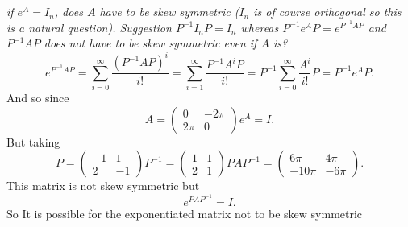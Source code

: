 \documentclass{article}
\begin{document}
    \section{}
    \emph{if $e^{A}=I_n$, does $A$ have to be skew symmetric ($I_n$ is of course orthogonal so this is a natural question). Suggestion
    $P^{-1}I_nP = I_n$ whereas $P^{-1}e^{A}P = e^{P^{-1}AP}$ and $P^{-1}AP$ does not have to be skew symmetric even if $A$ is?}
    \[
    e^{P^{-1}AP} = \sum_{i=0}^{\infty}\frac{(P^{-1}AP)^{i}}{i!} = \sum_{i=1}^{\infty}\frac{P^{-1}A^{i}P}{i!} = P^{-1}\sum_{i=0}^{\infty} \frac{A^{i}}{i!} P = P^{-1}e^{A}P
    .\] 
    And so since 
    \[
    A = 
    \begin{pmatrix}
        0 & -2\pi\\
        2\pi & 0
    \end{pmatrix}
    e^{A} = I
    .\] 
    But taking
    \[
    P = 
    \begin{pmatrix}
        -1 & 1\\
        2 & -1
    \end{pmatrix}
    P^{-1} =
    \begin{pmatrix}
        1 & 1\\
        2 & 1
    \end{pmatrix}
    PAP^{-1} = 
    \begin{pmatrix}
        6\pi & 4\pi\\
        -10\pi & -6\pi
    \end{pmatrix}
    .\] 
    This matrix is not skew symmetric but
    \[
    e^{PAP^{-1}} = I
    .\] 
    So It is possible for the exponentiated matrix not to be skew symmetric
    
\end{document}
